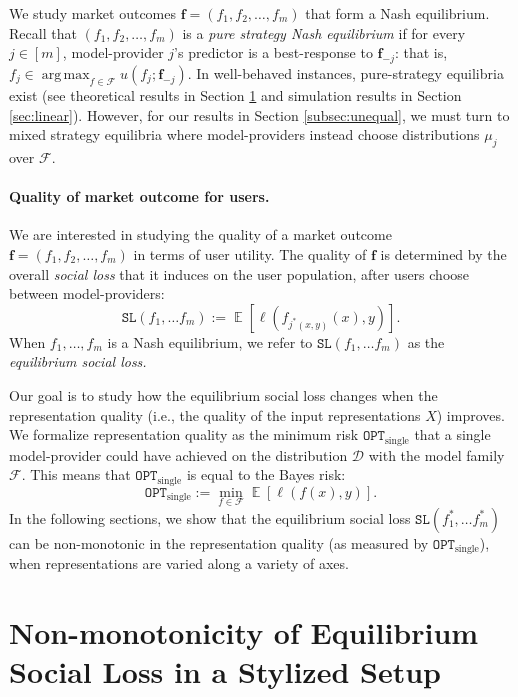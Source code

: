 \documentclass[letterpaper,11pt]{article}
\theoremstyle{plain}
\DeclareMathOperator*{\argmax}{arg\,max}
\DeclareMathOperator*{\E}{\mathbb{E}}
\begin{document}
We study market outcomes $\mathbf{f} = (f_1, f_2, \ldots, f_m)$ that form a Nash equilibrium. Recall that $(f_1, f_2, \ldots, f_m)$ is a \textit{pure strategy Nash equilibrium} if for every $j \in [m]$, model-provider $j$'s predictor is a best-response to $\mathbf{f}_{-j}$: that is, $f_j \in \argmax_{f\in \mathcal{F}} u(f_j; \mathbf{f}_{-j})$. In well-behaved instances, pure-strategy equilibria exist (see theoretical results in Section \ref{sec:theory} and simulation results in Section \ref{sec:linear}). However, for our results in Section \ref{subsec:unequal}, we must turn to mixed strategy equilibria where model-providers instead choose distributions $\mu_j$ over $\mathcal{F}$. 


\paragraph{Quality of market outcome for users.}
We are interested in studying the quality of a market outcome $\mathbf{f} = (f_1, f_2, \ldots, f_m)$ in terms of user utility. The quality of $\mathbf{f}$ is determined by the overall \textit{social loss} that it induces on the user population, after users choose between model-providers:
\begin{equation}
\label{eq:sociallossdef}
  \texttt{SL}(f_1, \ldots f_m) := \E[\ell(f_{j^*(x,y)}(x),y)]. 
\end{equation}
When $f_1, \ldots, f_m$ is a Nash equilibrium, we refer to $\texttt{SL}(f_1, \ldots f_m)$ as the \textit{equilibrium social loss.}

Our goal is to study how the equilibrium social loss changes when the representation quality (i.e., the quality of the input representations $X$) improves. We formalize representation quality as the minimum risk $\texttt{OPT}_{\text{single}}$ that a single model-provider could have achieved on the distribution $\mathcal{D}$ with the model family $\mathcal{F}$. This means that $\texttt{OPT}_{\text{single}}$ is equal to the Bayes risk:  
\[\texttt{OPT}_{\text{single}} := \min_{f \in \mathcal{F}} \E\left[ \ell(f(x),y)\right].\]
In the following sections, we show that the equilibrium social loss $\texttt{SL}(f^*_1, \ldots f^*_m)$ can be non-monotonic in the representation quality (as measured by $\texttt{OPT}_{\text{single}}$), when representations are varied along a variety of axes. 


\section{Non-monotonicity of Equilibrium Social Loss in a Stylized Setup}\label{sec:theory}
\end{document}
